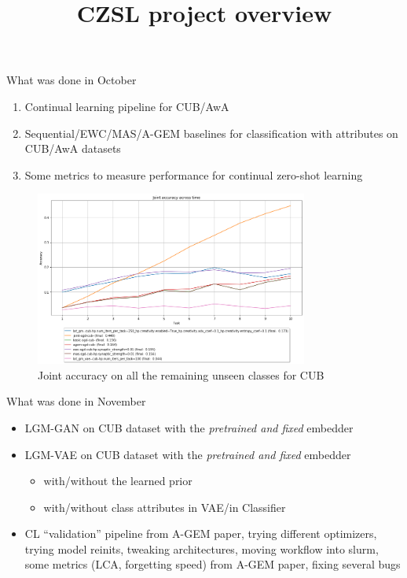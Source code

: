 \documentclass[10pt]{beamer}
\title{CZSL project overview}
\begin{document}
\begin{frame}
    \titlepage
\end{frame}


\begin{frame}{What was done in October}
    \begin{enumerate}
        \item Continual learning pipeline for CUB/AwA
        \item Sequential/EWC/MAS/A-GEM baselines for classification with attributes on CUB/AwA datasets
        \item Some metrics to measure performance for continual zero-shot learning
    \end{enumerate}
    
    \begin{figure}
        \centering
        \includegraphics[width=0.8\textwidth]{images/early-scores.png}
        \caption{Joint accuracy on all the remaining unseen classes for CUB}
    \end{figure}
    
\end{frame}

\begin{frame}{What was done in November}

\begin{itemize}
    \item LGM-GAN on CUB dataset with the \textit{pretrained and fixed} embedder
    \item LGM-VAE on CUB dataset with the \textit{pretrained and fixed} embedder
    \begin{itemize}
        \item with/without the learned prior
        \item with/without class attributes in VAE/in Classifier
    \end{itemize}
    \item CL ``validation'' pipeline from A-GEM paper, trying different optimizers, trying model reinits, tweaking architectures, moving workflow into slurm, some metrics (LCA, forgetting speed) from A-GEM paper, fixing several bugs
\end{itemize}
\end{frame}
\end{document}
